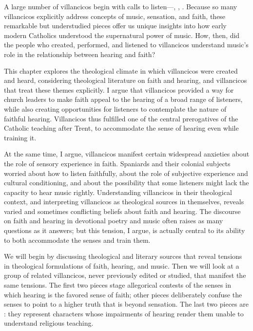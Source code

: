 A large number of villancicos begin with calls to listen---, , .
Because so many villancicos explicitly address concepts of music, sensation, and faith, these remarkable but understudied pieces offer us unique insights into how early modern Catholics understood the supernatural power of music.
How, then, did the people who created, performed, and listened to villancicos understand music's role in the relationship between hearing and faith?

This chapter explores the theological climate in which villancicos were created and heard, considering theological literature on faith and hearing, and villancicos that treat these themes explicitly.
I argue that villancicos provided a way for church leaders to make faith appeal to the hearing of a broad range of listeners, while also creating opportunities for listeners to contemplate the nature of faithful hearing.
Villancicos thus fulfilled one of the central prerogatives of the Catholic teaching after Trent, to accommodate the sense of hearing even while training it.

At the same time, I argue, villancicos manifest certain widespread anxieties about the role of sensory experience in faith. 
Spaniards and their colonial subjects worried about how to listen faithfully, about the role of subjective experience and cultural conditioning, and about the possibility that some listeners might lack the capacity to hear music rightly.
Understanding villancicos in their theological context, and interpreting villancicos as theological sources in themselves, reveals varied and sometimes conflicting beliefs about faith and hearing.
The discourse on faith and hearing in devotional poetry and music often raises as many questions as it answers; but this tension, I argue, is actually central to its ability to both accommodate the senses and train them.

We will begin by discussing theological and literary sources that reveal tensions in theological formulations of faith, hearing, and music.
Then we will look at a group of related villancicos, never previously edited or studied, that manifest the same tensions.
The first two pieces stage allegorical contests of the senses in which hearing is the favored sense of faith; other pieces deliberately confuse the senses to point to a higher truth that is beyond sensation.
The last two pieces are : they represent characters whose impairments of hearing render them unable to understand religious teaching.

